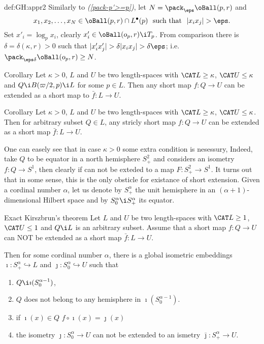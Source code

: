 {\begin{subthm}{def:GH:appr2}
 Similarly to \textit{(\ref{pack-p'>=p})}, let $N=\pack_{\eps}\oBall(p,r)$ and 
$$x_1,x_2,\dots, x_N\in\oBall(p,r)\cap L^\bullet(p)\ \ \text{such that}\ \ |x_ix_j|>\eps.$$ 
Set $x'_i=\log_px_i$, clearly $x_i'\in\oBall(o_p,r)\i T_p$.
From comparison there is $\delta=\delta(\kappa,r)>0$ such that 
$|x'_ix'_j|>\delta|x_ix_j|>\delta\eps$; i.e. $\pack_{\eps\delta}\oBall(o_p,r)\ge N$.



















\begin{thm}{Corollary}\label{cor:kir-from-hemisphere}
Let $\kappa>0$, $L$ and $U$ be two length-spaces with $\CAT L\ge \kappa$, $\CAT U\le\kappa$ and $Q\i B(\varpi/2,p)\i L$ for some $p\in L$.
Then any short map $f:Q\to U$ can be extended as a short map to $\bar f:L\to U$.
\end{thm}

\begin{thm}{Corollary}
Let $\kappa>0$, $L$ and $U$ be two length-spaces with $\CAT L\ge \kappa$, $\CAT U\le\kappa$.
Then for arbitrary subset $Q\in L$, any stricly short map $f:Q\to U$ can be extended as a short map 
$\bar f:L\to U$.
\end{thm}



One can easely see that in case $\kappa>0$ some extra condition is nesessury,
Indeed, take $Q$ to be equator in a north hemisphere $S^2_+$ and considers an isometry $f:Q\to S^{1}$, then clearly if can not be exteded to a map $F:S^2_+\to S^1$.
It turns out that in some sense, this is the only obsticle for existance of short extension.
Given a cordinal number $\alpha$, let us denote by $S^\alpha_+$ the unit hemisphere in an $(\alpha+1)$-dimensional Hilbert space and by $S^\alpha_0\i S^\alpha_+$ its equator.

\begin{thm}{Exact Kirszbrun's theorem}
Let $L$ and $U$ be two length-spaces with $\CAT L\ge1$, $\CAT U\le1$ and $Q\i L$ is an arbitrary subset.
Assume that a short map $f:Q\to U$ can NOT be extended as a short map 
$\bar f:L\to U$.

Then for some cordinal number $\alpha$, there is a global isometric embeddings $\imath:S^\alpha_+\hookrightarrow L$ and $\jmath:S^\alpha_0\hookrightarrow U$ such that
\begin{enumerate}
\item $Q\i \imath(S^{\alpha-1}_0)$,
\item $Q$ does not belong to any hemisphere in $\imath(S^{\alpha-1}_0)$.
\item if $\imath(x)\in Q$ $f\circ\imath(x)=\jmath(x)$ 
\item the isometry $\jmath:S^\alpha_0\to U$ can not be extended to an ismetry $\bar\jmath:S^\alpha_+\to U$.
\end{enumerate}
\end{thm}


\end{subthm}}
